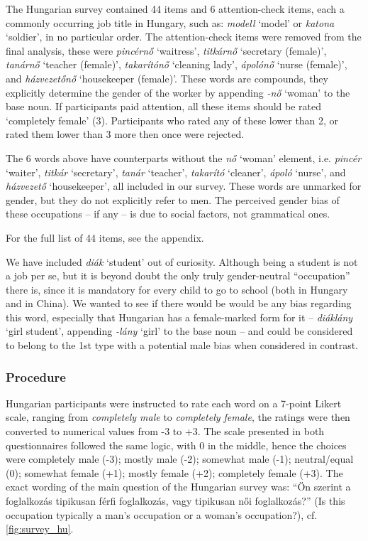 \documentclass[11pt]{article}
\begin{document}
The Hungarian survey contained 44 items and 6 attention-check items, each a commonly occurring job title in Hungary, such as: \textit{modell} `model' or \textit{katona} `soldier', in no particular order. The attention-check items were removed from the final analysis, these were \textit{pincérnő} `waitress', \textit{titkárnő} `secretary (female)', \textit{tanárnő} `teacher (female)', \textit{takarítónő} `cleaning lady', \textit{ápolónő} `nurse (female)', and \textit{házvezetőnő} `housekeeper (female)'. These words are compounds, they explicitly determine the gender of the worker by appending \textit{-nő} `woman' to the base noun. If participants paid attention, all these items should be rated `completely female' (3). Participants who rated any of these lower than 2, or rated them lower than 3 more then once were rejected.

The 6 words above have counterparts without the \textit{nő} `woman' element, i.e. \textit{pincér} `waiter', \textit{titkár} `secretary', \textit{tanár} `teacher', \textit{takarító} `cleaner', \textit{ápoló} `nurse', and \textit{házvezető} `housekeeper', all included in our survey. These words are unmarked for gender, but they do not explicitly refer to men. The perceived gender bias of these occupations -- if any -- is due to social factors, not grammatical ones.


For the full list of 44 items, see the appendix. 



We have included \textit{diák} `student' out of curiosity. Although being a student is not a job per se, but it is beyond doubt the only truly gender-neutral ``occupation'' there is, since it is mandatory for every child to go to school (both in Hungary and in China). We wanted to see if there would be would be any bias regarding this word, especially that Hungarian has a female-marked form for it -- \textit{diáklány} `girl student', appending \textit{-lány} `girl' to the base noun -- and could be considered to belong to the 1st type with a potential male bias when considered in contrast.

\subsubsection{Procedure}

Hungarian participants were instructed to rate each word on a 7-point Likert scale, ranging from \textit{completely male} to \textit{completely female}, the ratings were then converted to numerical values from -3 to +3. The scale presented in both questionnaires followed the same logic, with 0 in the middle, hence the choices were completely male (-3); mostly male (-2); somewhat male (-1); neutral/equal (0); somewhat female (+1); mostly female (+2); completely female (+3). The exact wording of the main question of the Hungarian survey was: ``Ön szerint a foglalkozás tipikusan férfi foglalkozás, vagy tipikusan női foglalkozás?'' (Is this occupation typically a man's occupation or a woman's occupation?), cf. \ref{fig:survey_hu}.
\end{document}
